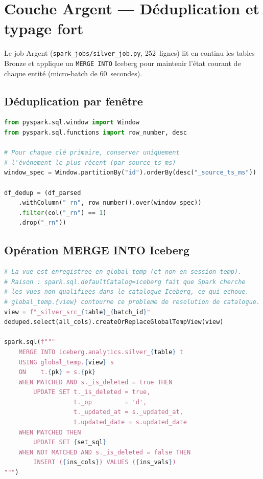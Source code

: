 \documentclass[12pt,a4paper]{report}
\begin{document}
\section{Couche Argent --- Déduplication et typage fort}

Le job Argent (\texttt{spark\_jobs/silver\_job.py}, 252~lignes) lit en
continu les tables Bronze et applique un \texttt{MERGE INTO} Iceberg pour
maintenir l'état courant de chaque entité (micro-batch de 60~secondes).

\subsection{Déduplication par fenêtre}

\begin{lstlisting}[language=Python,
    caption={Déduplication --- conservation de la dernière version par PK}]
from pyspark.sql.window import Window
from pyspark.sql.functions import row_number, desc

# Pour chaque clé primaire, conserver uniquement
# l'événement le plus récent (par source_ts_ms)
window_spec = Window.partitionBy("id").orderBy(desc("_source_ts_ms"))

df_dedup = (df_parsed
    .withColumn("_rn", row_number().over(window_spec))
    .filter(col("_rn") == 1)
    .drop("_rn"))
\end{lstlisting}

\subsection{Opération MERGE INTO Iceberg}

\begin{lstlisting}[language=Python,
    caption={Upsert atomique Iceberg via MERGE INTO (vue global\_temp)}]
# La vue est enregistree en global_temp (et non en session temp).
# Raison : spark.sql.defaultCatalog=iceberg fait que Spark cherche
# les vues non qualifiees dans le catalogue Iceberg, ce qui echoue.
# global_temp.{view} contourne ce probleme de resolution de catalogue.
view = f"_silver_src_{table}_{batch_id}"
deduped.select(all_cols).createOrReplaceGlobalTempView(view)

spark.sql(f"""
    MERGE INTO iceberg.analytics.silver_{table} t
    USING global_temp.{view} s
    ON    t.{pk} = s.{pk}
    WHEN MATCHED AND s._is_deleted = true THEN
        UPDATE SET t._is_deleted = true,
                   t._op         = 'd',
                   t._updated_at = s._updated_at,
                   t.updated_date = s.updated_date
    WHEN MATCHED THEN
        UPDATE SET {set_sql}
    WHEN NOT MATCHED AND s._is_deleted = false THEN
        INSERT ({ins_cols}) VALUES ({ins_vals})
""")
\end{lstlisting}
\end{document}
